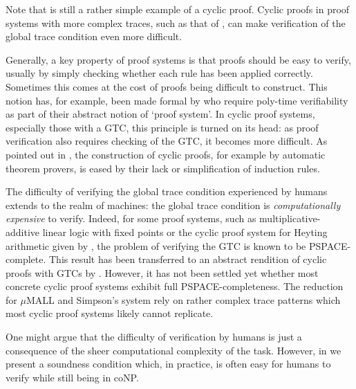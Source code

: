 Note that  is still a rather simple example of a cyclic proof.
Cyclic proofs in proof systems with more complex traces, such as that of
\textcite{simpsonCyclicArithmeticEquivalent2017},
can make verification of the global
trace condition even more difficult.

Generally, a key property of proof systems
is that proofs should be easy to verify, usually by simply checking whether each
rule has been applied correctly. Sometimes this comes at the cost of proofs being difficult
to construct. This notion has, for example, been made formal by
\textcite{cookRelativeEfficiencyPropositional1979} who require poly-time
verifiability as part of their abstract notion of `proof system'.
In cyclic proof systems, especially those with a GTC, this
principle is turned on its head: as proof verification also requires checking of
the GTC, it becomes more difficult. As pointed out in ,
the construction of cyclic proofs, for example by automatic theorem provers, is
eased by their lack or simplification of induction rules.

The difficulty of verifying the global trace condition experienced by humans
extends to the realm of machines: the global trace condition is
\emph{computationally expensive} to verify. Indeed, for some proof systems, such
as multiplicative-additive linear logic with fixed points
\parencite{nolletPSPACECompletenessThreadCriterion2019} or the cyclic proof system
for Heyting arithmetic given by \textcite{simpsonCyclicArithmeticEquivalent2017}, the problem of verifying the GTC is known to be
PSPACE-complete. This result has been transferred to an abstract rendition of
cyclic proofs with GTCs by \textcite{afshariAbstractCyclicProofs2022}. However,
it has not been settled yet whether most concrete cyclic proof systems exhibit full
PSPACE-completeness. The reduction for $\mu$MALL and Simpson's system rely on
rather complex trace patterns which most cyclic proof systems likely cannot
replicate.

One might argue that the difficulty of verification by humans is just a
consequence of the sheer computational complexity of the task. However, in
 we present a soundness condition which, in practice, is often
easy for humans to verify while still being in coNP.

